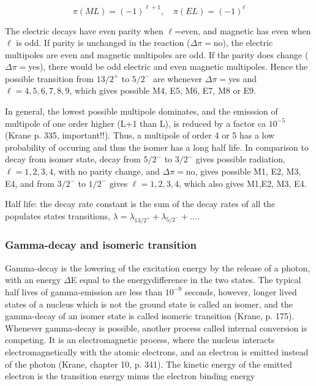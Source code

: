 \begin{equation}
    \pi(ML) = (-1)^{\ell+1}, \quad \pi(EL)=(-1)^{\ell}
\end{equation}
 
The electric decays have even parity when $\ell$=even, and magnetic has even when $\ell$ is odd. If parity is unchanged in the reaction ($\Delta \pi=$no), the electric multipoles are even and magnetic multipoles are odd. If the parity does change ($\Delta\pi=$yes), there would be odd electric and even magnetic multipoles. Hence the possible transition from $13/2^+$ to $5/2^-$ are whenever $\Delta \pi=$yes and $\ell=4,5,6,7,8,9$, which gives possible M4, E5, M6, E7, M8 or E9. 

In general, the lowest possible multipole dominates, and the emisssion of multipole of one order higher (L+1 than L), is reduced by a factor ca $10^{-5}$ (Krane p. 335, important!!). Thus, a multipole of order 4 or 5 has a low probability of occuring and thus the isomer has a long half life.  
In comparison to decay from isomer state, decay from $5/2^-$ to $3/2^-$ gives possible radiation, $\ell=1,2,3,4$, with no parity change, and $\Delta \pi=$no, gives possible M1, E2, M3, E4, and from $3/2^-$ to $1/2^-$ gives $\ell=1,2,3,4$, which also gives M1,E2, M3, E4. 

Half life: the decay rate constant is the sum of the decay rates of all the populates states  transitions, $\lambda=\lambda_{13/2^+} + \lambda_{5/2^-}+ ...$. 







\subsubsection{Gamma-decay and isomeric transition}
Gamma-decay is the lowering of the excitation energy by the release of a photon, with an energy $\Delta$E equal to the energydifference in the two states. The typical half lives of gamma-emission are less than $10^{-9}$ seconds, however, longer lived states of a nucleus which is not the ground state is called an isomer, and the gamma-decay of an isomer state is called isomeric transition (Krane, p. 175). Whenever gamma-decay is possible, another process called internal conversion is competing. It is an electromagnetic process, where the nucleus interacts electromagnetically with the atomic electrons, and an electron is emitted instead of the photon (Krane, chapter 10, p. 341). The kinetic energy of the emitted electron is the transition energy minus the electron binding energy

